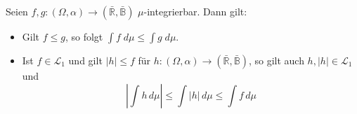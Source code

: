 \documentclass[10pt]{article}
\newenvironment{Aufgabe}[2][Aufgabe]{\begin{trivlist}
\item[\hskip \labelsep {\bfseries #1}\hskip \labelsep {\bfseries #2.}]}{\end{trivlist}}
\begin{document}
\newpage

\begin{Aufgabe}{2} %
Seien $f,g : (\Omega,\alpha) \rightarrow (\bar{\mathbb{R}}, \bar{\mathbb{B}})$ $\mu$-integrierbar. Dann gilt:
\begin{itemize}
\item[(iii)] Gilt $f \leq g$, so folgt $\int f \; d\mu \leq \int g \; d\mu$.
\item[(iv)] Ist $f \in \mathcal{L}_1$ und gilt $|h| \leq f$ für $h:(\Omega,\alpha) \rightarrow (\bar{\mathbb{R}},\bar{\mathbb{B}})$, so gilt auch $h, |h| \in \mathcal{L}_1$ und
\begin{equation}
\label{eq: ineq}
\left| \int h \, d\mu \right| \leq \int \left| h \right| \, d\mu \leq \int f \, d\mu
\end{equation}
\end{itemize}
\end{Aufgabe}
\end{document}
